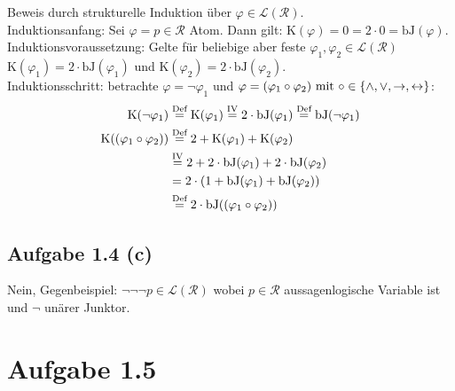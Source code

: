 \documentclass[12pt,a4paper]{article}
\renewcommand{\k}{\text{K}}
\newcommand{\bj}{\text{bJ}}
\begin{document}
Beweis durch strukturelle Induktion über $\varphi\in\mathcal{L}(\mathcal{R})$.\\
Induktionsanfang: Sei $\varphi=p\in\mathcal{R}$ Atom. Dann gilt: $\k(\varphi)=0=2\cdot 0=\bj(\varphi)$.\\
Induktionsvoraussetzung: Gelte für beliebige aber feste $\varphi_1,\varphi_2\in\mathcal{L}(\mathcal{R})$\\
$\k(\varphi_1)=2\cdot\bj(\varphi_1)$ und $\k(\varphi_2)=2\cdot\bj(\varphi_2)$.\\ 
Induktionsschritt: betrachte $\varphi=\neg\varphi_1$ und $\varphi=(\varphi_1\circ\varphi_2)\mit\circ\in\lbrace\wedge,\vee,\to,\leftrightarrow\rbrace$: 
\begin{align*}
\k(\neg \varphi_1)
&\stackeq{\text{Def}}\k(\varphi_1)
\stackeq{\text{IV}}2\cdot\bj(\varphi_1)
\stackeq{\text{Def}}\bj(\neg \varphi_1)\\
\k((\varphi_1\circ \varphi_2))
&\stackeq{\text{Def}}2+\k(\varphi_1)+\k(\varphi_2)\\
&\stackeq{\text{IV}}2+2\cdot\bj(\varphi_1)+2\cdot\bj(\varphi_2)\\
&=2\cdot(1+\bj(\varphi_1)+\bj(\varphi_2))\\
&\stackeq{\text{Def}}2\cdot\bj((\varphi_1\circ \varphi_2))
\end{align*}

\subsection*{Aufgabe 1.4 (c)}
Nein, Gegenbeispiel: $\neg\neg\neg p\in\mathcal{L}(\mathcal{R})$ wobei  $p\in\mathcal{R}$ aussagenlogische Variable ist und $\neg$ unärer Junktor.

\section*{Aufgabe 1.5}
\end{document}
